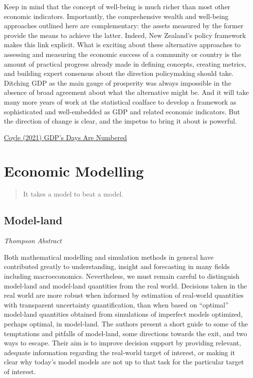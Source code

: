 \documentclass[
]{book}
\begin{document}
Keep in mind that the concept of well-being is much richer than most other economic indicators. Importantly, the comprehensive wealth and well-being approaches outlined here are complementary: the assets measured by the former provide the means to achieve the latter. Indeed, New Zealand's policy framework makes this link explicit. What is exciting about these alternative approaches to assessing and measuring the economic success of a community or country is the amount of practical progress already made in defining concepts, creating metrics, and building expert consensus about the direction policymaking should take. Ditching GDP as the main gauge of prosperity was always impossible in the absence of broad agreement about what the alternative might be. And it will take many more years of work at the statistical coalface to develop a framework as sophisticated and well-embedded as GDP and related economic indicators. But the direction of change is clear, and the impetus to bring it about is powerful.

\href{https://www.project-syndicate.org/commentary/replacing-gdp-with-wealth-and-wellbeing-indicators-by-diane-coyle-2021-12}{Coyle (2021) GDP's Days Are Numbered}

\hypertarget{economic-modelling}{%
\chapter{Economic Modelling}\label{economic-modelling}}

\begin{quote}
It takes a model to beat a model.
\end{quote}

\hypertarget{model-land}{%
\section{Model-land}\label{model-land}}

\emph{Thompson Abstract}

Both mathematical modelling and simulation methods in general have contributed greatly
to understanding, insight and forecasting in many fields including macroeconomics.
Nevertheless, we must remain careful to distinguish model-land and model-land quantities
from the real world. Decisions taken in the real world are more robust when informed by
estimation of real-world quantities with transparent uncertainty quantification, than when
based on ``optimal'' model-land quantities obtained from simulations of imperfect models
optimized, perhaps optimal, in model-land. The authors present a short guide to some
of the temptations and pitfalls of model-land, some directions towards the exit, and two
ways to escape. Their aim is to improve decision support by providing relevant, adequate
information regarding the real-world target of interest, or making it clear why today's
model models are not up to that task for the particular target of interest.
\end{document}
